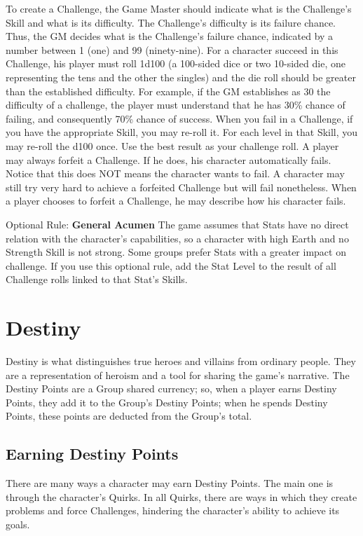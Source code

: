 \begin{multicols}{2}
To create a Challenge, the Game Master
should indicate what is the Challenge’s Skill and
what is its difficulty. The Challenge’s difficulty is its
failure chance. Thus, the GM decides what is the
Challenge’s failure chance, indicated by a number
between 1 (one) and 99 (ninety-nine). For a
character succeed in this Challenge, his player
must roll 1d100 (a 100-sided dice or two 10-sided
die, one representing the tens and the other the
singles) and the die roll should be greater than the
established difficulty. For example, if the GM
establishes as 30 the difficulty of a challenge, the
player must understand that he has 30\% chance of
failing, and consequently 70\% chance of success.
When you fail in a Challenge, if you have
the appropriate Skill, you may re-roll it. For each
level in that Skill, you may re-roll the d100 once.
Use the best result as your challenge roll.
A player may always forfeit a Challenge. If
he does, his character automatically fails. Notice
that this does NOT means the character wants to
fail. A character may still try very hard to achieve a
forfeited Challenge but will fail nonetheless. When
a player chooses to forfeit a Challenge, he may
describe how his character fails.

Optional Rule: \textbf{General Acumen}
The game assumes that Stats have no direct
relation with the character's capabilities, so a
character with high Earth and no Strength Skill is
not strong. Some groups prefer Stats with a
greater impact on challenge. If you use this
optional rule, add the Stat Level to the result of
all Challenge rolls linked to that Stat's Skills.

\section{Destiny}
Destiny is what distinguishes true heroes
and villains from ordinary people. They are a
representation of heroism and a tool for sharing
the game's narrative. The Destiny Points are a
Group shared currency; so, when a player earns
Destiny Points, they add it to the Group’s Destiny
Points; when he spends Destiny Points, these
points are deducted from the Group's total.
\subsection{Earning Destiny Points}
There are many ways a character may earn
Destiny Points. The main one is through the
character's Quirks. In all Quirks, there are ways in
which they create problems and force Challenges,
hindering the character’s ability to achieve its
goals.


\end{multicols}
